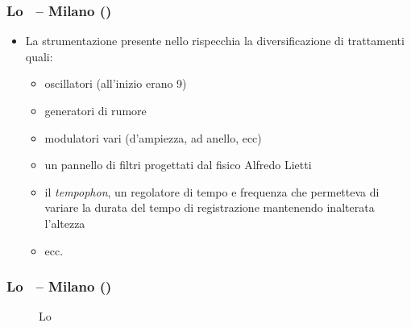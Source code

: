 \begin{frame}
    \frametitle{Lo \sfm\ -- Milano ()}

    \begin{itemize}

        \item La strumentazione presente nello \sfm rispecchia la diversificazione
            di trattamenti quali:

        \begin{itemize}

            \item oscillatori (all'inizio erano 9)

            \item generatori di rumore

            \item modulatori vari (d'ampiezza, ad anello, ecc)

            \item un pannello di filtri progettati dal fisico Alfredo Lietti

            \item il \emph{tempophon}, un regolatore di tempo e frequenza
                che permetteva di variare la durata del
                tempo di registrazione mantenendo inalterata l'altezza

            \item ecc.

        \end{itemize}

    \end{itemize}

\end{frame}

\begin{frame}
    \frametitle{Lo \sfm\ -- Milano ()}

    \begin{center}
    \begin{figure}
        \caption{Lo \sfm}
    \end{figure}
    \end{center}

\end{frame}
